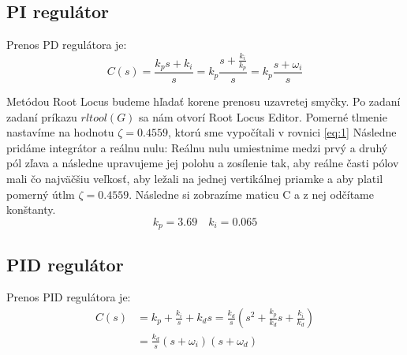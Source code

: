 \documentclass[journal]{IEEEtran}
\begin{document}
\subsection{PI regulátor}
Prenos PD regulátora je:
\begin{equation}
C(s)=\frac{k_ps +k_i}{s}=k_p\frac{s+\frac{k_i}{k_p}}{s}=k_p\frac{s+\omega_i}{s}
\end{equation}

Metódou Root Locus budeme hľadať korene prenosu uzavretej smyčky.
Po zadaní zadaní príkazu $\mathit{rltool(G)}$ 
sa nám otvorí Root Locus Editor. Pomerné tlmenie nastavíme na hodnotu $\zeta=0.4559$, ktorú sme vypočítali v rovnici \ref{eq:1} 
Následne pridáme integrátor a reálnu nulu:
Reálnu nulu umiestnime medzi prvý a druhý pól zľava a následne upravujeme jej polohu a zosílenie tak, aby reálne časti pólov mali čo najväčšiu veľkosť, aby ležali na jednej vertikálnej priamke a aby platil pomerný útlm $\zeta=0.4559$.
Následne si zobrazíme maticu C a z nej odčítame konštanty.
\begin{equation}
k_p=3.69\quad k_i=0.065
\end{equation}

\subsection{PID regulátor}
Prenos PID regulátora je:
\begin{align}
C(s)&=k_p +\frac{k_i}{s}+ k_ds=\frac{k_d}{s}\left(s^2+\frac{k_p}{k_d}s+\frac{k_i}{k_d}\right)\\&=\frac{k_d}{s}(s+\omega_i)(s+\omega_d)
\end{align}
\end{document}
